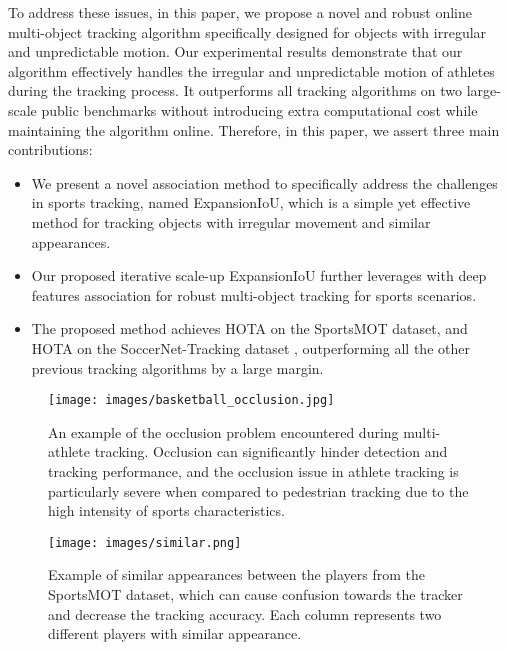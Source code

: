 \documentclass[10pt,twocolumn,letterpaper]{article}
\begin{document}
To address these issues, in this paper, we propose a novel and robust online multi-object tracking algorithm specifically designed for objects with irregular and unpredictable motion. Our experimental results demonstrate that our algorithm effectively handles the irregular and unpredictable motion of athletes during the tracking process. It outperforms all tracking algorithms on two large-scale public benchmarks \cite{cui2023sportsmot} without introducing extra computational cost while maintaining the algorithm online. Therefore, in this paper, we assert three main contributions:

\begin{itemize}
\setlength{\itemsep}{0pt}
\setlength{\parsep}{0pt}
\setlength{\parskip}{0pt}
    \item We present a novel association method to specifically address the challenges in sports tracking, named ExpansionIoU, which is a simple yet effective method for tracking objects with irregular movement and similar appearances.
    \item Our proposed iterative scale-up ExpansionIoU further leverages with deep features association for robust multi-object tracking for sports scenarios. 
    \item The proposed method achieves  HOTA on the SportsMOT \cite{cui2023sportsmot} dataset, and  HOTA on the SoccerNet-Tracking dataset \cite{cioppa2022soccernet}, outperforming all the other previous tracking algorithms by a large margin.
\end{itemize}

\begin{figure}[t]
  \centering
  \texttt{[image: images/basketball\_occlusion.jpg]}
  \caption{An example of the occlusion problem encountered during multi-athlete tracking. Occlusion can significantly hinder detection and tracking performance, and the occlusion issue in athlete tracking is particularly severe when compared to pedestrian tracking due to the high intensity of sports characteristics.}
  \label{fig:occlusion}
\end{figure}

\begin{figure}[t]
  \centering
  \texttt{[image: images/similar.png]}
  \caption{Example of similar appearances between the players from the SportsMOT dataset, which can cause confusion towards the tracker and decrease the tracking accuracy. Each column represents two different players with similar appearance.}
  \label{fig:similar}
\end{figure}
\end{document}
